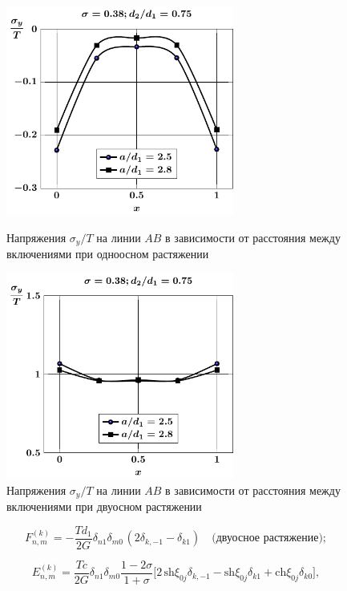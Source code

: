 \begin{figure}[h!]
\centering\footnotesize
\parbox[b]{7.5cm}{\centering\includegraphics[width=7.5cm]{periodic-inc27-a-d75-g25-t1-sig_y.pdf}
\caption{Напряжения $\sigma_y/T$ на линии $AB$ в зависимости от расстояния между включениями при одноосном растяжении
\label{f:11:27}}}\hfil\hfil
\parbox[b]{7.5cm}{\centering\includegraphics[width=7.5cm]{periodic-inc27-a-d75-g25-t2-sig_y.pdf}
\caption{Напряжения $\sigma_y/T$ на линии $AB$ в зависимости от расстояния между включениями при двуосном растяжении
\label{f:11:28}}}
\end{figure}

\begin{equation*}
F_{n,m}^{(k)} =  -\frac{Td_1}{2G}{\delta _{n1}}{\delta _{m0\,}}(2{\delta _{k, - 1}} - {\delta _{k1}})\quad\text{(двуосное растяжение)};
\end{equation*}

\begin{equation*}
E_{n,m}^{(k)} =\frac{Tc}{2G}\delta_{n1}\delta_{m0}\frac{1-2\sigma}{1+\sigma}\bigg[2\,\mathrm{sh}\xi_{0j}\delta_{k,-1}-\mathrm{sh}\xi_{0j}\delta_{k1}+\mathrm{ch}\xi_{0j}\delta_{k0}\bigg],
\end{equation*}

